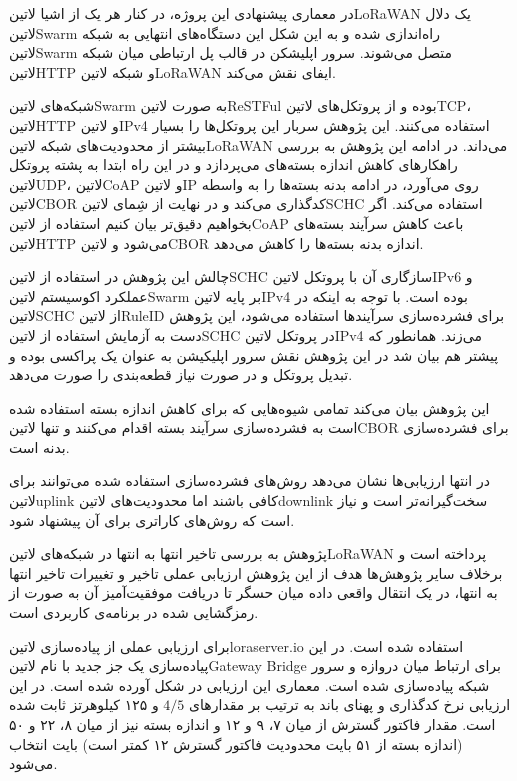 در معماری پیشنهادی این پروژه، در کنار هر یک از اشیا ‌لاتین{LoRaWAN} یک دلال ‌لاتین{Swarm} راه‌اندازی شده و به این شکل
این دستگاه‌های انتهایی به شبکه ‌لاتین{Swarm} متصل می‌شوند. سرور اپلیشکن در قالب پل ارتباطی میان شبکه ‌لاتین{HTTP}
و شبکه ‌لاتین{LoRaWAN} ایفای نقش می‌کند.

شبکه‌های ‌لاتین{Swarm} به صورت ‌لاتین{ReSTFul} بوده و از پروتکل‌های ‌لاتین{TCP}، ‌لاتین{HTTP} و ‌لاتین{IPv4}
استفاده می‌کنند. این پژوهش سربار این پروتکل‌ها را بسیار بیشتر از محدودیت‌های شبکه ‌لاتین{LoRaWAN} می‌داند.
در ادامه این پژوهش به بررسی راهکارهای کاهش اندازه بسته‌های می‌پردازد و در این راه ابتدا به پشته پروتکل ‌لاتین{UDP}، ‌لاتین{CoAP} و ‌لاتین{IP}
روی می‌آورد، در ادامه بدنه بسته‌ها را به واسطه ‌لاتین{CBOR} کدگذاری می‌کند
و در نهایت از شِمای ‌لاتین{SCHC} استفاده می‌کند.
اگر بخواهیم دقیق‌تر بیان کنیم استفاده از ‌لاتین{CoAP} باعث کاهش سرآیند بسته‌های ‌لاتین{HTTP} می‌شود و ‌لاتین{CBOR}
اندازه بدنه بسته‌ها را کاهش می‌دهد.

چالش این پژوهش در استفاده از ‌لاتین{SCHC} سازگاری آن با پروتکل ‌لاتین{IPv6} و عملکرد اکوسیستم ‌لاتین{Swarm}
بر پایه ‌لاتین{IPv4} بوده است.
با توجه به اینکه در ‌لاتین{SCHC} از ‌لاتین{RuleID} برای فشرده‌سازی سرآیندها استفاده می‌شود، این پژوهش دست به آزمایش
استفاده از ‌لاتین{SCHC} در پروتکل ‌لاتین{IPv4} می‌زند.
همانطور که پیشتر هم بیان شد در این پژوهش نقش سرور اپلیکیشن به عنوان یک پراکسی بوده و تبدیل پروتکل و در صورت نیاز
قطعه‌بندی را صورت می‌دهد.

این پژوهش بیان می‌کند تمامی شیوه‌هایی که برای کاهش اندازه بسته استفاده شده است به فشرده‌سازی سرآیند بسته اقدام می‌کنند
و تنها ‌لاتین{CBOR} برای فشرده‌سازی بدنه است.

در انتها ارزیابی‌ها نشان می‌دهد روش‌های فشرده‌سازی استفاده شده می‌توانند برای ‌لاتین{uplink} کافی باشند اما
محدودیت‌های ‌لاتین{downlink} سخت‌گیرانه‌تر است و نیاز است که روش‌های کاراتری برای آن پیشنهاد شود.


پژوهش  به بررسی تاخیر انتها به انتها در شبکه‌های ‌لاتین{LoRaWAN} پرداخته است و برخلاف سایر پژوهش‌ها هدف از این پژوهش
ارزیابی عملی تاخیر و تغییرات تاخیر انتها به انتها، در یک انتقال واقعی داده میان حسگر تا دریافت موفقیت‌آمیز آن به صورت از رمزگشایی شده در برنامه‌ی کاربردی است.

برای ارزیابی عملی از پیاده‌سازی ‌لاتین{loraserver.io} استفاده شده است. در این پیاده‌سازی یک جز جدید با نام ‌لاتین{Gateway Bridge}
برای ارتباط میان دروازه و سرور شبکه پیاده‌سازی شده است. معماری این ارزیابی در شکل  آورده شده است.
در این ارزیابی نرخ کدگذاری و پهنای باند به ترتیب بر مقدارهای $4/5$ و ۱۲۵ کیلوهرتز ثابت شده است.
مقدار فاکتور گسترش از میان ۷، ۹ و ۱۲ و اندازه بسته نیز از میان ۸، ۲۲ و ۵۰ (اندازه بسته از ۵۱ بایت محدودیت فاکتور گسترش ۱۲ کمتر است) بایت انتخاب می‌شود.

